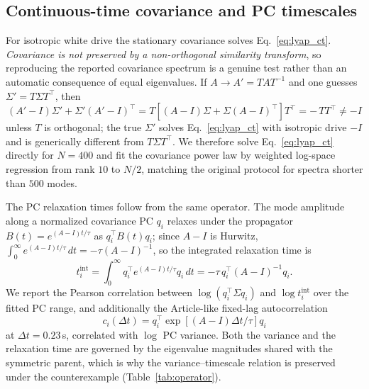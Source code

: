 \documentclass[11pt]{article}
\begin{document}
\subsection{Continuous-time covariance and PC timescales}
For isotropic white drive the stationary covariance solves
Eq.~\eqref{eq:lyap_ct}. \emph{Covariance is not preserved by a non-orthogonal
similarity transform}, so reproducing the reported covariance spectrum is a
genuine test rather than an automatic consequence of equal eigenvalues. If
$A\to A'=TAT^{-1}$ and one guesses $\Sigma'=T\Sigma T^\top$, then
\begin{equation}
(A'-I)\Sigma'+\Sigma'(A'-I)^\top
=T\!\left[(A-I)\Sigma+\Sigma(A-I)^\top\right]\!T^\top
=-\,T T^\top\neq -I
\end{equation}
unless $T$ is orthogonal; the true $\Sigma'$ solves Eq.~\eqref{eq:lyap_ct} with
isotropic drive $-I$ and is generically different from $T\Sigma T^\top$. We
therefore solve Eq.~\eqref{eq:lyap_ct} directly for $N=400$ and fit the
covariance power law by weighted log-space regression from rank $10$ to $N/2$,
matching the original protocol for spectra shorter than $500$ modes.

The PC relaxation times follow from the same operator. The mode amplitude along
a normalized covariance PC $q_i$ relaxes under the propagator
$B(t)=e^{(A-I)t/\tau}$ as $q_i^\top B(t)q_i$; since $A-I$ is Hurwitz,
$\int_0^\infty e^{(A-I)t/\tau}\,dt=-\tau(A-I)^{-1}$, so the integrated relaxation
time is
\begin{equation}
t_i^{\mathrm{int}}=\int_0^\infty q_i^\top e^{(A-I)t/\tau}q_i\,dt
=-\tau\,q_i^\top(A-I)^{-1}q_i.
\end{equation}
We report the Pearson correlation between $\log(q_i^\top\Sigma q_i)$ and
$\log t_i^{\mathrm{int}}$ over the fitted PC range, and additionally the
Article-like fixed-lag autocorrelation
\begin{equation}
  c_i(\Delta t)=q_i^\top\exp[(A-I)\Delta t/\tau]q_i
\end{equation}
at $\Delta t=0.23$\,s, correlated with $\log$ PC variance. Both the variance and
the relaxation time are governed by the eigenvalue magnitudes shared with the
symmetric parent, which is why the variance--timescale relation is preserved
under the counterexample (Table~\ref{tab:operator}).
\end{document}
